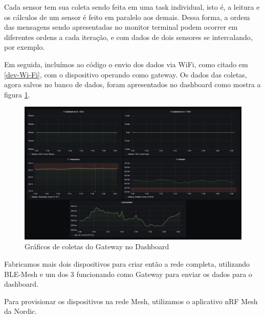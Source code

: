 \documentclass[../monografia.tex]{subfiles}
\begin{document}
Cada sensor tem sua coleta sendo feita em uma task individual, isto é, a leitura e os cálculos de um sensor é feito em paralelo aos demais. Dessa forma, a ordem das mensagens sendo apresentadas no monitor terminal podem ocorrer em diferentes ordens a cada iteração, e com dados de dois sensores se intercalando, por exemplo. \newpage

Em seguida, incluímos ao código o envio dos dados via WiFi, como citado em \ref{dev-Wi-Fi}, com o dispositivo operando como gateway. Os dados das coletas, agora salvos no banco de dados, foram apresentados no dashboard como mostra a figura \ref{fig:dashboard-graphs}.

\begin{figure}[h]
	\centering
	\includegraphics[width=\textwidth]{dashboard-graphs}
	\caption{Gráficos de coletas do Gateway no Dashboard}
	\label{fig:dashboard-graphs}
\end{figure}

Fabricamos mais dois dispositivos para criar então a rede completa, utilizando BLE-Mesh e um dos 3 funcionando como Gateway para enviar os dados para o dashboard. 

Para provisionar os dispositivos na rede Mesh, utilizamos o aplicativo nRF Mesh\cite{nrf-app} da Nordic. 
\end{document}
